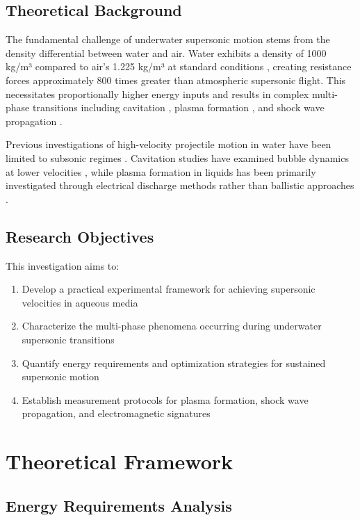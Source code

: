 \documentclass[12pt,a4paper]{article}
\begin{document}
\subsection{Theoretical Background}

The fundamental challenge of underwater supersonic motion stems from the density differential between water and air. Water exhibits a density of 1000 kg/m³ compared to air's 1.225 kg/m³ at standard conditions \cite{white2016fluid}, creating resistance forces approximately 800 times greater than atmospheric supersonic flight. This necessitates proportionally higher energy inputs and results in complex multi-phase transitions including cavitation \cite{brennen2014cavitation}, plasma formation \cite{fridman2008plasma}, and shock wave propagation \cite{glass1974shock}.

Previous investigations of high-velocity projectile motion in water have been limited to subsonic regimes \cite{hirt1974volume, shi2010numerical}. Cavitation studies have examined bubble dynamics at lower velocities \cite{plesset1977bubble}, while plasma formation in liquids has been primarily investigated through electrical discharge methods rather than ballistic approaches \cite{bruggeman2002plasma}.

\subsection{Research Objectives}

This investigation aims to:
\begin{enumerate}
\item Develop a practical experimental framework for achieving supersonic velocities in aqueous media
\item Characterize the multi-phase phenomena occurring during underwater supersonic transitions
\item Quantify energy requirements and optimization strategies for sustained supersonic motion
\item Establish measurement protocols for plasma formation, shock wave propagation, and electromagnetic signatures
\end{enumerate}

\section{Theoretical Framework}

\subsection{Energy Requirements Analysis}
\end{document}
